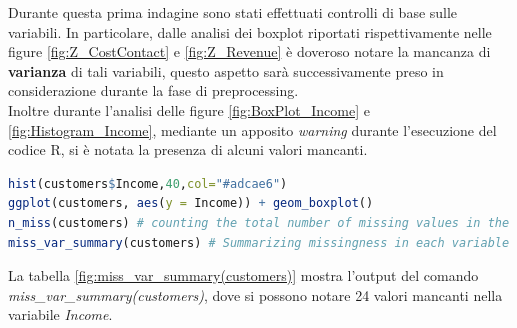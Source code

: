 \documentclass[letterpaper,11pt]{article}
\begin{document}
Durante questa prima indagine sono stati effettuati controlli di base sulle variabili. In particolare, dalle analisi dei boxplot riportati rispettivamente nelle figure \ref{fig:Z_CostContact} e \ref{fig:Z_Revenue} è doveroso notare la mancanza di \textbf{varianza} di tali variabili, questo aspetto sarà successivamente preso in considerazione durante la fase di preprocessing.\\ Inoltre durante l'analisi delle figure \ref{fig:BoxPlot_Income} e \ref{fig:Histogram_Income}, mediante un apposito \textit{warning} durante l'esecuzione del codice R, si è notata la presenza di alcuni valori mancanti.
\begin{lstlisting}[language=R]
hist(customers$Income,40,col="#adcae6")
ggplot(customers, aes(y = Income)) + geom_boxplot()
n_miss(customers) # counting the total number of missing values in the data
miss_var_summary(customers) # Summarizing missingness in each variable 
\end{lstlisting}
La tabella \ref{fig:miss_var_summary(customers)} mostra l'output del comando \textit{miss\_var\_summary(customers)}, dove si possono notare 24 valori mancanti nella variabile \textit{Income}.
\end{document}
